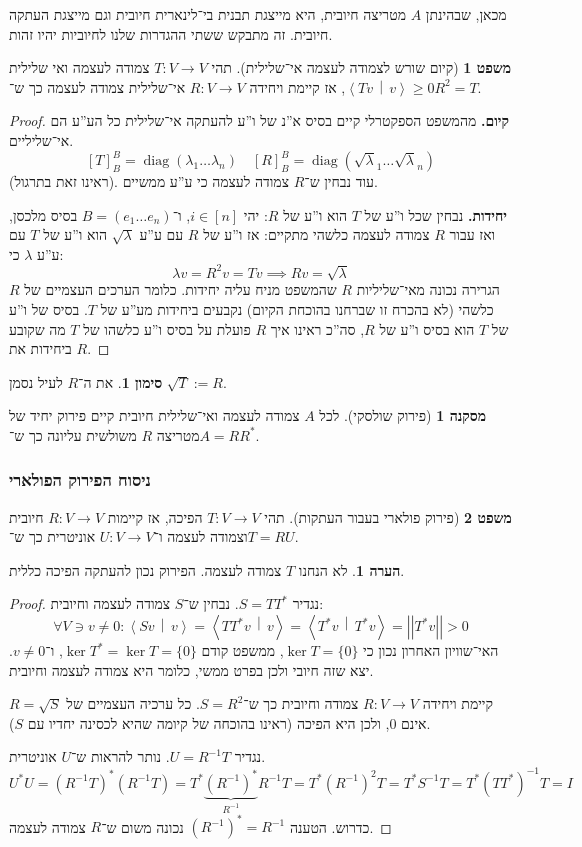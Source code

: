 \documentclass[a4paper]{article}
\newcommand\ra    {\rangle}
\newcommand\la    {\langle}
\DeclareMathOperator{\diag}    {diag}
\newcommand\co        {\colon}
\newcommand\norm[1]   {\left \vert \left \vert #1 \right \vert \right \vert}
\newcommand\mut [2]   {\left \la #1 \,\middle|\, #2 \right \ra}
\renewcommand\lg      {\lambda}
\newcommand\op    {^{-1}}
\theoremstyle{definition}
\newtheorem{Theorem}{\color{myblue}משפט}
\newtheorem{Remark}{\color{mycyan}הערה}
\newtheorem{Notion}{\color{myred}סימון}
\newtheorem{Collary}{\color{mymagenta}מסקנה}
\newcommand\rmark [1] {\begin{Remark}#1\end{Remark}}
\newcommand\noti  [1] {\begin{Notion}#1\end{Notion}}
\begin{document}
	מכאן, שבהינתן $A$ מטריצה חיובית, היא מייצגת תבנית בי־לינארית חיובית וגם מייצגת העתקה חיובית. זה מתבקש ששתי ההגדרות שלנו לחיוביות יהיו זהות. 
	
	\begin{Theorem}[קיום שורש לצמודה לעצמה אי־שלילית]
		תהי $T \co V \to V$ צמודה לעצמה ואי שלילית $\mut{Tv}{v} \ge 0$, אז קיימת ויחידה $R \co V \to V$ אי־שלילית צמודה לעצמה כך ש־$R^2 = T$. 
	\end{Theorem}
	
	\begin{proof}
		\textbf{קיום. }
		מהמשפט הספקטרלי קיים בסיס א''נ של ו''ע להעתקה אי־שלילית כל הע''ע הם אי־שליליים. 
		\[ [T]^{B}_B = \diag(\lg_1 \dots \lg_n) \quad [R]_B^B = \diag(\sqrt \lg_1 \dots \sqrt \lg_n) \]
		(ראינו זאת בתרגול). עוד נבחין ש־$R$ צמודה לעצמה כי ע''ע ממשיים. 
		
		\textbf{יחידות. }נבחין שכל ו''ע של $T$ הוא ו''ע של $R$: יהי $i \in [n]$, ו־$B = (e_1 \dots e_n)$ בסיס מלכסן, ואז עבור $R$ צמודה לעצמה כלשהי מתקיים: אז ו''ע של $R$ עם ע''ע $\sqrt \lg$ הוא ו''ע של $T$ עם ע''ע $\lg$ כי: 
		\[ \lg v = R^2v = Tv \implies Rv = \sqrt \lg \]
		הגרירה נכונה מאי־שליליות $R$ שהמשפט מניח עליה יחידות. כלומר הערכים העצמיים של $R$ כלשהי (לא בהכרח זו שברחנו בהוכחת הקיום) נקבעים ביחידות מע''ע של $T$. בסיס של ו''ע של $T$ הוא בסיס ו''ע של $R$, סה''כ ראינו איך $R$ פועלת על בסיס ו''ע כלשהו של $T$ מה שקובע ביחידות את $R$. 
	\end{proof}
	
	\noti{את ה־$R$ לעיל נסמן $\sqrt{T} := R$. }
	
	\begin{Collary}[פירוק שולסקי]
		לכל $A$ צמודה לעצמה ואי־שלילית חיובית קיים פירוק יחיד של מטריצה $R$ משולשית עליונה כך ש־$A=RR^*$. 
	\end{Collary}
	
	\subsubsection{ניסוח הפירוק הפולארי}
	\begin{Theorem}[פירוק פולארי בעבור העתקות]
		תהי $T \co V \to V$ הפיכה, אז קיימות $R \co V \to V$ חיובית וצמודה לעצמה ו־$U \co V \to V$ אוניטרית כך ש־$T = RU$. 
	\end{Theorem}
	\rmark{לא הנחנו $T$ צמודה לעצמה. הפירוק נכון להעתקה הפיכה כללית. }
	\begin{proof}
		נגדיר $S = TT^*$. נבחין ש־$S$ צמודה לעצמה וחיובית: 
		\[ \forall V \ni v \neq 0 \co \mut{Sv}{v} = \mut{TT^* v}{v} = \mut{T^* v}{T^*v} = \norm{T^*v} > 0 \]
		האי־שוויון האחרון נכון כי $\ker T = \{0\}$, ממשפט קודם $\ker T^* = \ker T = \{0\}$, ו־$v \neq 0$. יצא שזה חיובי ולכן בפרט ממשי, כלומר היא צמודה לעצמה וחיובית. 
		
		קיימת ויחידה $R \co V \to V$ צמודה וחיובית כך ש־$S = R^2$. כל ערכיה העצמיים של $R = \sqrt S$ אינם $0$, ולכן היא הפיכה (ראינו בהוכחה של קיומה שהיא לכסינה יחדיו עם $S$). 
		
		נגדיר $U = R\op T$. נותר להראות ש־$U$ אוניטרית. 
		\[ U^*U = (R\op T)^*(R\op T) = T^*\underbrace{(R\op)^*}_{R\op}R\op T = T^*(R\op)^2 T = T^*S\op T = T^*(TT^*)\op T = I \]
		כדרוש. הטענה $(R\op)^* = R\op$ נכונה משום ש־$R$ צמודה לעצמה. 
	\end{proof}
	
\end{document}
